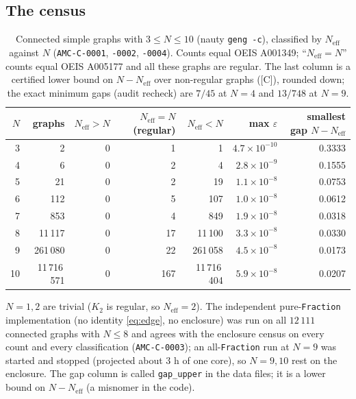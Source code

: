 \documentclass[10pt]{article}
\newcommand{\tier}[1]{\textsf{[#1]}}
\newcommand{\tC}{\tier{C}}
\newcommand{\Neff}{N_{\mathrm{eff}}}
\begin{document}
\subsection{The census}
\begin{table}[h]\centering\small
\caption{Connected simple graphs with $3\le N\le10$ (nauty \texttt{geng -c}), classified by $\Neff$ against $N$ (\texttt{AMC-C-0001}, \texttt{-0002}, \texttt{-0004}). Counts equal OEIS A001349; ``$\Neff=N$'' counts equal OEIS A005177 and all these graphs are regular. The last column is a certified lower bound on $N-\Neff$ over non-regular graphs (\tC), rounded down; the exact minimum gaps (audit recheck) are $7/45$ at $N=4$ and $13/748$ at $N=9$.}
\begin{tabular}{rrrrrrr}\toprule
$N$ & graphs & $\Neff>N$ & $\Neff=N$ (regular) & $\Neff<N$ & max $\varepsilon$ & smallest gap $N-\Neff$\\\midrule
3 & 2 & 0 & 1 & 1 & $4.7\!\times\!10^{-10}$ & 0.3333\\
4 & 6 & 0 & 2 & 4 & $2.8\!\times\!10^{-9}$ & 0.1555\\
5 & 21 & 0 & 2 & 19 & $1.1\!\times\!10^{-8}$ & 0.0753\\
6 & 112 & 0 & 5 & 107 & $1.0\!\times\!10^{-8}$ & 0.0612\\
7 & 853 & 0 & 4 & 849 & $1.9\!\times\!10^{-8}$ & 0.0318\\
8 & 11\,117 & 0 & 17 & 11\,100 & $3.3\!\times\!10^{-8}$ & 0.0330\\
9 & 261\,080 & 0 & 22 & 261\,058 & $4.5\!\times\!10^{-8}$ & 0.0173\\
10 & 11\,716\,571 & 0 & 167 & 11\,716\,404 & $5.9\!\times\!10^{-8}$ & 0.0207\\\bottomrule
\end{tabular}
\end{table}
$N=1,2$ are trivial ($K_2$ is regular, so $\Neff=2$). The independent pure-\texttt{Fraction} implementation (no identity \eqref{eq:edge}, no enclosure) was run on all $12\,111$ connected graphs with $N\le8$ and
agrees with the enclosure census on every count and every classification (\texttt{AMC-C-0003}); an all-\texttt{Fraction} run at $N=9$ was started and stopped (projected about 3 h of one core), so $N=9,10$ rest on the enclosure.
The gap column is called \texttt{gap\_upper} in the data files; it is a lower bound on $N-\Neff$ (a misnomer in the code).
\end{document}
